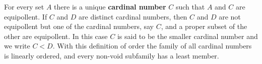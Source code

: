 For every set $A$ there is a unique \textbf{cardinal number} $C$ such that $A$ and $C$ are equipollent. If $C$ and $D$ are distinct cardinal numbers, then $C$ and $D$ are not equipollent but one of the cardinal numbers, say $C$, and a proper subset of the other are equipollent. In this case $C$ is said to be the smaller cardinal number and we write $C < D$. With this definition of order the family of all cardinal numbers is linearly ordered, and every non-void subfamily has a least member.
